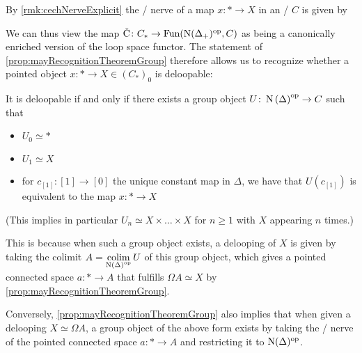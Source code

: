 \begin{remark}
    By \cref{rmk:cechNerveExplicit} the \Cech/ nerve of a map $x\colon*\to X$ in an \inftytop/ $C$ is given by
    \begin{center}
    \end{center}
    We can thus view the map $\CN\colon C_*\to\Fun(\N(\Delta_+)^{\op},C)$ as being a canonically enriched version of the loop space functor.
    The statement of \cref{prop:mayRecognitionTheoremGroup} therefore allows us to recognize whether a pointed object $x\colon*\to X\in\left(C_*\right)_0$ is deloopable:

    It is deloopable if and only if there exists a group object $U\colon\operatorname{N}\left(\Delta\right)^{\operatorname{op}}\to C$ such that 
    \begin{itemize}
        \item $U_0\simeq*$
        \item $U_1\simeq X$
        \item for $c_{[1]}\colon[1]\to[0]$ the unique constant map in $\Delta$, we have that $U(c_{[1]})$ is equivalent to the map $x\colon*\to X$
    \end{itemize}
    (This implies in particular $U_n\simeq X\times\ldots\times X$ for $n\geq1$ with $X$ appearing $n$ times.)

    This is because when such a group object exists, a delooping of $X$ is given by taking the colimit $A=\operatorname*{colim}\limits_{\operatorname{N}\left(\Delta\right)^{\operatorname{op}}} U$ of this group object, which gives a pointed connected space $a\colon*\to A$ that fulfills $\Omega A\simeq X$ by \cref{prop:mayRecognitionTheoremGroup}.

    Conversely, \cref{prop:mayRecognitionTheoremGroup} also implies that when given a delooping $X\simeq\Omega A$, a group object of the above form exists by taking the \Cech/ nerve of the pointed connected space $a\colon*\to A$ and restricting it to $\operatorname{N}(\Delta)^{\operatorname{op}}$.
\end{remark}
